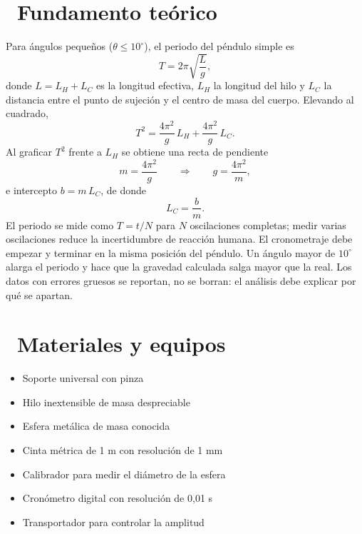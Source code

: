 \documentclass[11pt,a4paper]{article}
\newcommand{\iconotexto}[2]{\textcolor{cyanNeon}{\faIcon{#1}}~#2}
\begin{document}
\section{\iconotexto{book-open}{Fundamento teórico}}

Para ángulos pequeños ($\theta \le 10^\circ$), el periodo del péndulo
simple es
\[
  T = 2\pi\sqrt{\frac{L}{g}},
\]
donde $L = L_H + L_C$ es la longitud efectiva, $L_H$ la longitud del hilo
y $L_C$ la distancia entre el punto de sujeción y el centro de masa del
cuerpo. Elevando al cuadrado,
\[
  T^2 = \frac{4\pi^2}{g}\,L_H + \frac{4\pi^2}{g}\,L_C.
\]
Al graficar $T^2$ frente a $L_H$ se obtiene una recta de pendiente
\[
  m = \frac{4\pi^2}{g}
  \qquad\Longrightarrow\qquad
  g = \frac{4\pi^2}{m},
\]
e intercepto $b = m\,L_C$, de donde
\[
  L_C = \frac{b}{m}.
\]
El periodo se mide como $T = t/N$ para $N$ oscilaciones completas; medir
varias oscilaciones reduce la incertidumbre de reacción humana. El
cronometraje debe empezar y terminar en la misma posición del péndulo. Un
ángulo mayor de $10^\circ$ alarga el periodo y hace que la gravedad
calculada salga mayor que la real. Los datos con errores gruesos se
reportan, no se borran: el análisis debe explicar por qué se apartan.

\begin{center}
\par{}
\end{center}

\section{\iconotexto{box-open}{Materiales y equipos}}

\begin{itemize}[leftmargin=1.4em,itemsep=2pt,topsep=3pt]
  \item Soporte universal con pinza
  \item Hilo inextensible de masa despreciable
  \item Esfera metálica de masa conocida
  \item Cinta métrica de 1 m con resolución de 1 mm
  \item Calibrador para medir el diámetro de la esfera
  \item Cronómetro digital con resolución de 0,01 s
  \item Transportador para controlar la amplitud
\end{itemize}
\end{document}
